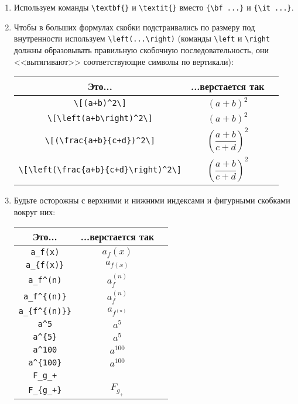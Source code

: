 \begin{enumerate}
\item
	Используем команды \verb'\textbf{}' и \verb'\textit{}' вместо \verb'{\bf ...}' и \verb'{\it ...}'.

\item
	Чтобы в больших формулах скобки подстраивались по размеру под внутренности
	используем \verb'\left(...\right)'
	(команды \verb'\left' и \verb'\right' должны образовывать правильную скобочную последовательность,
	они <<вытягивают>> соответствующие символы по вертикали):
	\begin{center}\begin{tabular}{|c|c|c|}
		\hline Это... & ...верстается так & \\
		\hline \verb'\[(a+b)^2\]'                        & \begin{minipage}{3cm}\[(a+b)^2\]\end{minipage} \ok \\
		\hline \verb'\[\left(a+b\right)^2\]'             & \begin{minipage}{3cm}\[\left(a+b\right)^2\]\end{minipage} \ok \\
		\hline \verb'\[(\frac{a+b}{c+d})^2\]'            & \begin{minipage}{3cm}\[(\frac{a+b}{c+d})^2\]\end{minipage} \bad \\
		\hline \verb'\[\left(\frac{a+b}{c+d}\right)^2\]' & \begin{minipage}{3cm}\[\left(\frac{a+b}{c+d}\right)^2\]\end{minipage} \ok \\
		\hline
	\end{tabular}\end{center}

\item
	Будьте осторожны с верхними и нижними индексами и фигурными скобками вокруг них:
	\begin{center}\begin{tabular}{|c|c|c|}
		\hline Это... & ...верстается так & \\
		\hline \verb'a_f(x)'      & $a_f(x)$ \bad \\
		\hline \verb'a_{f(x)}'    & $a_{f(x)}$ \ok \\
		\hline \verb'a_f^(n)'     & $a_f^(n)$ \bad \\
		\hline \verb'a_f^{(n)}'   & $a_f^{(n)}$ \bad \\
		\hline \verb'a_{f^{(n)}}' & $a_{f^{(n)}}$ \ok \\
		\hline \verb'a^5'         & $a^5$ \ok \\
		\hline \verb'a^{5}'       & $a^{5}$ \ok \\
		\hline \verb'a^100'       & $a^100$ \bad \\
		\hline \verb'a^{100}'     & $a^{100}$ \ok \\
		\hline \verb'F_g_+'       & \bad \\
		\hline \verb'F_{g_+}'     & $F_{g_+}$ \ok \\
		\hline
	\end{tabular}\end{center}


\end{enumerate}
